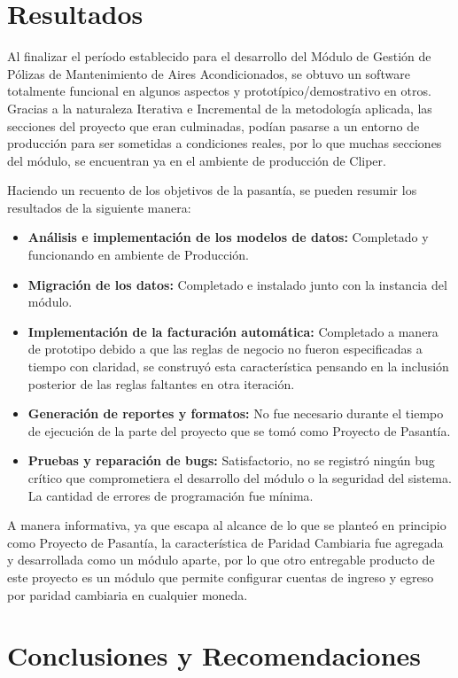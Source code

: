 \documentclass[a4paper, 12pt]{article}
\begin{document}
\newpage
\section{Resultados}
Al finalizar el período establecido para el desarrollo del Módulo de Gestión de Pólizas de Mantenimiento de Aires Acondicionados, se obtuvo un software totalmente funcional en algunos aspectos y prototípico/demostrativo en otros. Gracias a la naturaleza Iterativa e Incremental de la metodología aplicada, las secciones del proyecto que eran culminadas, podían pasarse a un entorno de producción para ser sometidas a condiciones reales, por lo que muchas secciones del módulo, se encuentran ya en el ambiente de producción de Cliper.

Haciendo un recuento de los objetivos de la pasantía, se pueden resumir los resultados de la siguiente manera:
\begin{itemize}
    \item \textbf{Análisis e implementación de los modelos de datos:} Completado y funcionando en ambiente de Producción.
    \item \textbf{Migración de los datos:} Completado e instalado junto con la instancia del módulo.
    \item \textbf{Implementación de la facturación automática:} Completado a manera de prototipo debido a que las reglas de negocio no fueron especificadas a tiempo con claridad, se construyó esta característica pensando en la inclusión posterior de las reglas faltantes en otra iteración.
    \item \textbf{Generación de reportes y formatos:} No fue necesario durante el tiempo de ejecución de la parte del proyecto que se tomó como Proyecto de Pasantía.
    \item \textbf{Pruebas y reparación de bugs:} Satisfactorio, no se registró ningún bug crítico que comprometiera el desarrollo del módulo o la seguridad del sistema. La cantidad de errores de programación fue mínima.
\end{itemize}

A manera informativa, ya que escapa al alcance de lo que se planteó en principio como Proyecto de Pasantía, la característica de Paridad Cambiaria fue agregada y desarrollada como un módulo aparte, por lo que otro entregable producto de este proyecto es un módulo que permite configurar cuentas de ingreso y egreso por paridad cambiaria en cualquier moneda.

\newpage
\section{Conclusiones y Recomendaciones}
\end{document}
